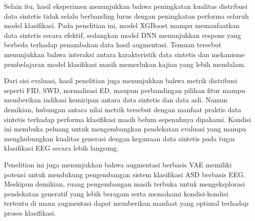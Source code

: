Selain itu, hasil eksperimen menunjukkan bahwa peningkatan kualitas distribusi data sintetis tidak selalu berbanding lurus dengan peningkatan performa seluruh model klasifikasi. Pada penelitian ini, model XGBoost mampu memanfaatkan data sintetis secara efektif, sedangkan model DNN menunjukkan respons yang berbeda terhadap penambahan data hasil augmentasi. Temuan tersebut menunjukkan bahwa interaksi antara karakteristik data sintetis dan mekanisme pembelajaran model klasifikasi masih memerlukan kajian yang lebih mendalam.

Dari sisi evaluasi, hasil penelitian juga menunjukkan bahwa metrik distribusi seperti FID, SWD, normalisasi ED, maupun perbandingan pilihan fitur mampu memberikan indikasi kemiripan antara data sintetis dan data asli. Namun demikian, hubungan antara nilai metrik tersebut dengan manfaat praktis data sintetis terhadap performa klasifikasi masih belum sepenuhnya dipahami. Kondisi ini membuka peluang untuk mengembangkan pendekatan evaluasi yang mampu menghubungkan kualitas generasi dengan kegunaan data sintetis pada tugas klasifikasi EEG secara lebih langsung.

Penelitian ini juga menunjukkan bahwa augmentasi berbasis VAE memiliki potensi untuk mendukung pengembangan sistem klasifikasi ASD berbasis EEG. Meskipun demikian, ruang pengembangan masih terbuka untuk mengeksplorasi pendekatan generatif yang lebih beragam serta memahami kondisi-kondisi tertentu di mana augmentasi dapat memberikan manfaat yang optimal terhadap proses klasifikasi.